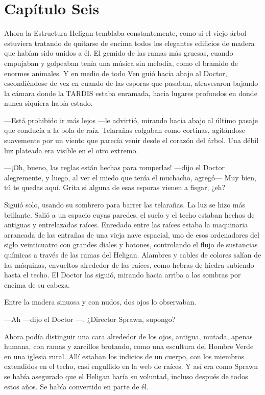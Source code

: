 \chapter*{Capítulo Seis}

Ahora la Estructura Heligan temblaba constantemente, como si el viejo
árbol estuviera tratando de quitarse de encima todos los elegantes
edificios de madera que habían sido unidos a él. El gemido de las ramas
más gruesas, cuando empujaban y golpeaban tenía una música sin melodía,
como el bramido de enormes animales. Y en medio de todo Ven guió hacia
abajo al Doctor, escondiéndose de vez en cuando de las esporas que
pasaban, atravesaron bajando la cámara donde la TARDIS estaba enramada,
hacia lugares profundos en donde nunca siquiera había estado.

---Está prohibido ir más lejos ---le advirtió, mirando hacia abajo al
último pasaje que conducía a la bola de raíz. Telarañas colgaban como
cortinas, agitándose suavemente por un viento que parecía venir desde el
corazón del árbol. Una débil luz plateada era visible en el otro
extremo.

---¡Oh, bueno, las reglas están hechas para romperlas! ---dijo el Doctor
alegremente, y luego, al ver el miedo que tenía el muchacho, agregó---
Muy bien, tú te quedas aquí. Grita si alguna de esas esporas vienen a
fisgar, ¿eh?

Siguió solo, usando su sombrero para barrer las telarañas. La luz se
hizo más brillante. Salió a un espacio cuyas paredes, el suelo y el
techo estaban hechos de antiguas y entrelazadas raíces. Enredado entre
las raíces estaba la maquinaria arrancada de las entrañas de una vieja
nave espacial, uno de esos ordenadores del siglo veinticuatro con
grandes diales y botones, controlando el flujo de sustancias químicas a
través de las ramas del Heligan. Alambres y cables de colores salían de
las máquinas, envueltos alrededor de las raíces, como hebras de hiedra
subiendo hasta el techo. El Doctor las siguió, mirando hacia arriba a
las sombras por encima de su cabeza.

Entre la madera sinuosa y con nudos, dos ojos lo observaban.

---Ah ---dijo el Doctor ---. ¿Director Sprawn, supongo?

Ahora podía distinguir una cara alrededor de los ojos, antigua, mutada,
apenas humana, con ramas y zarcillos brotando, como una escultura del
Hombre Verde en una iglesia rural. Allí estaban los indicios de un
cuerpo, con los miembros extendidos en el techo, casi engullido en la
web de raíces. Y así era como Sprawn se había asegurado que el Heligan
haría su voluntad, incluso después de todos estos años. Se había
convertido en parte de él.

